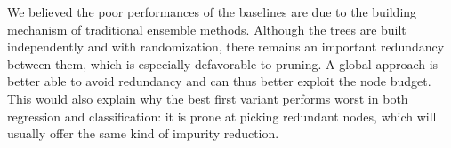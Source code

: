 \documentclass{article}
\begin{document}
We believed the poor performances of the baselines are due to the building 
mechanism of traditional ensemble methods. Although the trees are built 
independently and with randomization, there remains an important redundancy 
between them, which is especially defavorable to pruning. A global approach is 
better able to avoid redundancy and can thus better exploit the node budget. 
This would also explain why the best first variant performs worst in both 
regression and classification: it is prone at picking redundant nodes, which 
will usually offer the same kind of impurity reduction.







\end{document}
